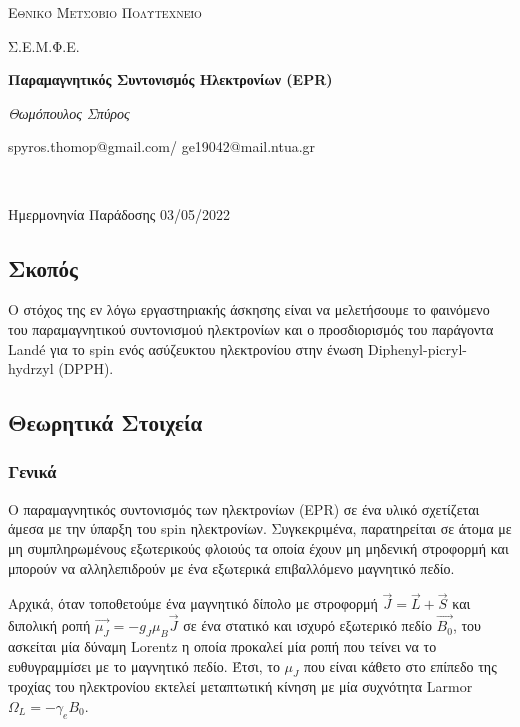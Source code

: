 \documentclass[a4paper]{article}
\begin{document}
\begin{titlepage}			%
	\centering
	{\scshape\LARGE Εθνικό Μετσόβιο Πολυτεχνείο\par}
	{\scshape \LARGE Σ.Ε.Μ.Φ.Ε.\par}
	\vspace{1cm}
	{\huge\bfseries Παραμαγνητικός Συντονισμός Ηλεκτρονίων (EPR)\par}
	\vspace{1cm}
	{\Large\itshape Θωμόπουλος Σπύρος\par}		%
	
	{\large spyros.thomop@gmail.com/ ge19042@mail.ntua.gr\par \hfill \\}%
	\vspace{1cm}
	{\large Ημερμονηνία Παράδοσης 03/05/2022\par}
\end{titlepage}

\subsection*{Σκοπός}

	Ο στόχος της εν λόγω εργαστηριακής άσκησης είναι να μελετήσουμε το φαινόμενο του παραμαγνητικού συντονισμού ηλεκτρονίων και ο προσδιορισμός του παράγοντα Landé για το spin ενός ασύζευκτου ηλεκτρονίου στην ένωση Diphenyl-picryl-hydrzyl (DPPH).
	
\subsection*{Θεωρητικά Στοιχεία}

	\subsubsection*{Γενικά}
		
		Ο παραμαγνητικός συντονισμός των ηλεκτρονίων (EPR) σε ένα υλικό σχετίζεται άμεσα με την ύπαρξη του spin ηλεκτρονίων. Συγκεκριμένα, παρατηρείται σε άτομα με μη συμπληρωμένους εξωτερικούς φλοιούς τα οποία έχουν μη μηδενική στροφορμή και μπορούν να αλληλεπιδρούν με ένα εξωτερικά επιβαλλόμενο μαγνητικό πεδίο. 
		
		Αρχικά, όταν τοποθετούμε ένα μαγνητικό δίπολο με στροφορμή $\vec{J}=\vec{L}+\vec{S}$ και διπολική ροπή $\vec{\mu_J} =-g_J\mu_B\vec{J}$ σε ένα στατικό και ισχυρό εξωτερικό πεδίο $\vec{B_0}$, του ασκείται μία δύναμη Lorentz η οποία προκαλεί μία ροπή που τείνει να το ευθυγραμμίσει με το μαγνητικό πεδίο. Έτσι, το $\mu_J$ που είναι κάθετο στο επίπεδο της τροχίας του ηλεκτρονίου εκτελεί μεταπτωτική κίνηση με μία συχνότητα Larmor $\Omega_L = -\gamma_e B_0$.
		
\end{document}
